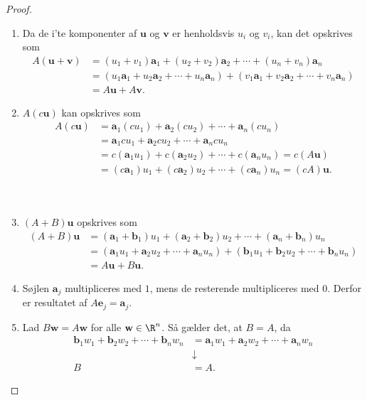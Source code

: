 \begin{proof}
\begin{enumerate}[label=(\alph*)]
\item Da de i'te komponenter af $\textbf{u}$ og $\textbf{v}$ er henholdsvis $u_i$ og $v_i$, kan det opskrives som
\begin{align*}
A(\mathbf{u}+\mathbf{v})&=(u_1+v_1)\mathbf{a}_1+(u_2+v_2)\mathbf{a}_2+\cdots + (u_n+v_n)\mathbf{a}_n \\
&=(u_1\mathbf{a}_1+u_2\mathbf{a}_2+\cdots+u_n\mathbf{a}_n)+(v_1\mathbf{a}_1+v_2\mathbf{a}_2+\cdots+v_n\mathbf{a}_n) \\
&=A\mathbf{u}+A\mathbf{v}.
\end{align*}
%
\item $A(c\mathbf{u})$ kan opskrives som
\begin{align*}
A(c \textbf{u})&=\textbf{a}_1(cu_1)+\textbf{a}_2(cu_2) + \cdots + \textbf{a}_n(cu_n) \\
&=\textbf{a}_1cu_1+\textbf{a}_2cu_2 + \cdots + \textbf{a}_ncu_n \\
&=c(\textbf{a}_1u_1)+c(\textbf{a}_2u_2)+\cdots+c(\textbf{a}_n u_n)
=c(A \textbf{u}) \\
&=(c\textbf{a}_1)u_1+(c\textbf{a}_2)u_2+\cdots+(c\textbf{a}_n)u_n=(cA)\textbf{u}.
\end{align*}
\\\\
%
\item $(A+B)\mathbf{u}$ opskrives som
%
\begin{align*}
(A+B)\textbf{u}&=(\textbf{a}_1+\textbf{b}_1)u_1 +(\textbf{a}_2+\textbf{b}_2)u_2 + \cdots + (\textbf{a}_n+\textbf{b}_n)u_n \\
&=(\textbf{a}_1u_1+\textbf{a}_2u_2+ \cdots + \textbf{a}_nu_n)+(\textbf{b}_1u_1+\textbf{b}_2u_2+ \cdots + \textbf{b}_nu_n) \\
&=A\textbf{u}+B\textbf{u}.
\end{align*}
%
\item Søjlen $\mathbf{a}_j$ multipliceres med $1$, mens de resterende multipliceres med $0$. 
Derfor er resultatet af $A\mathbf{e}_j=\mathbf{a}_j.$
%
\item Lad $B\mathbf{w}=A\mathbf{w}$ for alle $\mathbf{w} \in \R^n$.
Så gælder det, at $B=A$, da
%
\begin{align*}
\textbf{b}_1w_1+\textbf{b}_2 w_2+\cdots+\textbf{b}_n w_n &=\textbf{a}_1 w_1+\textbf{a}_2 w_2+\cdots+\textbf{a}_n w_n \\
&\downarrow\\
B&=A.
\end{align*}

\end{enumerate}
\end{proof}
